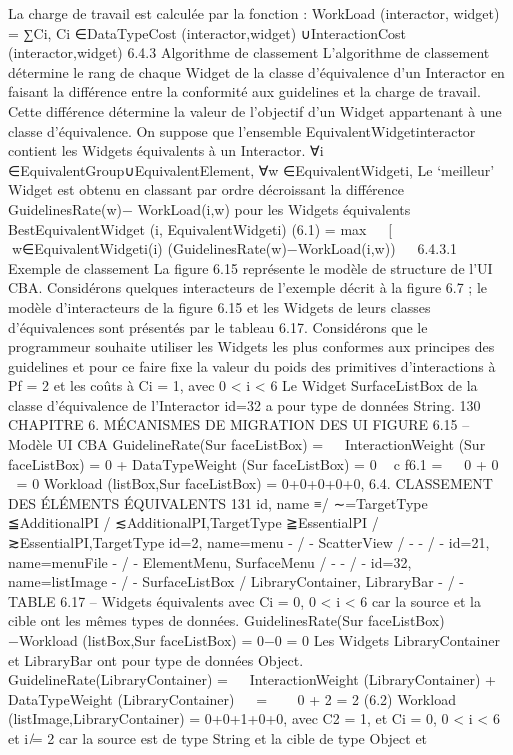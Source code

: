 \documentclass{article}
\begin{document}
La charge de travail est calculée par la fonction :
WorkLoad (interactor, widget) = ∑Ci,
Ci ∈DataTypeCost (interactor,widget) ∪InteractionCost (interactor,widget)
6.4.3
Algorithme de classement
L’algorithme de classement détermine le rang de chaque Widget de la classe d’équivalence d’un
Interactor en faisant la différence entre la conformité aux guidelines et la charge de travail. Cette
différence détermine la valeur de l’objectif d’un Widget appartenant à une classe d’équivalence. On
suppose que l’ensemble EquivalentWidgetinteractor contient les Widgets équivalents à un Interactor.
∀i ∈EquivalentGroup∪EquivalentElement,
∀w ∈EquivalentWidgeti,
Le ‘meilleur’ Widget est obtenu en classant par ordre décroissant la différence GuidelinesRate(w)−
WorkLoad(i,w) pour les Widgets équivalents
BestEquivalentWidget (i, EquivalentWidgeti)
(6.1)
=
max


[
∀w∈EquivalentWidgeti(i)
(GuidelinesRate(w)−WorkLoad(i,w))


6.4.3.1
Exemple de classement
La ﬁgure 6.15 représente le modèle de structure de l’UI CBA. Considérons quelques interacteurs
de l’exemple décrit à la ﬁgure 6.7 ; le modèle d’interacteurs de la ﬁgure 6.15 et les Widgets de leurs
classes d’équivalences sont présentés par le tableau 6.17.
Considérons que le programmeur souhaite utiliser les Widgets les plus conformes aux principes
des guidelines et pour ce faire ﬁxe la valeur du poids des primitives d’interactions à Pf = 2 et les coûts
à Ci = 1, avec 0 < i < 6
Le Widget SurfaceListBox de la classe d’équivalence de l’Interactor id=32 a pour type de données
String.
130
CHAPITRE 6. MÉCANISMES DE MIGRATION DES UI
FIGURE 6.15 – Modèle UI CBA
GuidelineRate(Sur faceListBox) =


InteractionWeight (Sur faceListBox) = 0
+
DataTypeWeight (Sur faceListBox) = 0

c f6.1
=


0
+
0


= 0
Workload (listBox,Sur faceListBox) = 0+0+0+0+0,
6.4. CLASSEMENT DES ÉLÉMENTS ÉQUIVALENTS
131
id, name
≡/ ∼=TargetType
≦AdditionalPI
/ ≲AdditionalPI,TargetType
≧EssentialPI
/ ≳EssentialPI,TargetType
id=2, name=menu
- / -
ScatterView / -
- / -
id=21, name=menuFile
- / -
ElementMenu,
SurfaceMenu / -
- / -
id=32, name=listImage
- / -
SurfaceListBox /
LibraryContainer,
LibraryBar
- / -
TABLE 6.17 – Widgets équivalents
avec Ci = 0, 0 < i < 6 car la source et la cible ont les mêmes types de données.
GuidelinesRate(Sur faceListBox) −Workload (listBox,Sur faceListBox) = 0−0
= 0
Les Widgets LibraryContainer et LibraryBar ont pour type de données Object.
GuidelineRate(LibraryContainer) =


InteractionWeight (LibraryContainer)
+
DataTypeWeight (LibraryContainer)


=



0
+
2
= 2
(6.2)
Workload (listImage,LibraryContainer) = 0+0+1+0+0,
avec C2 = 1, et Ci = 0, 0 < i < 6 et i ̸= 2 car la source est de type String et la cible de type Object et
\end{document}
